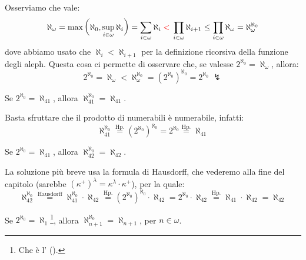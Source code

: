 \begin{example}
	Osserviamo che vale:
	\[ \aleph_\omega = \max\left(\aleph_0, \sup_{i \in \omega} \aleph_i\right) = \sum_{i \in \omega} \aleph_i \;\textcolor{red}{<}\; \prod_{i \in \omega} \aleph_{i + 1} \leq \prod_{i \in \omega} \aleph_\omega = \aleph_\omega^{\aleph_0}
		\]
	dove abbiamo usato che $\aleph_i < \aleph_{i + 1}$ per la definizione ricorsiva della funzione degli aleph. Questa cosa ci permette di osservare che, se valesse $2^{\aleph_0} = \aleph_\omega$, allora:
	\[ 2^{\aleph_0} = \aleph_\omega < \aleph_\omega^{\aleph_0} = (2^{\aleph_0})^{\aleph_0} = 2^{\aleph_0} \; \lightning
		\]
\end{example}

\begin{exercise}[Facile]
	Se $2^{\aleph_0} = \aleph_{41}$, allora $\aleph_{41}^{\aleph_0} = \aleph_{41}$.
\end{exercise}

\begin{soln}
	Basta sfruttare che il prodotto di numerabili è numerabile, infatti:
	\[ \aleph_{41}^{\aleph_0} \overset{\text{Hp.}}{=} (2^{\aleph_0})^{\aleph_0} = 2^{\aleph_0} \overset{\text{Hp.}}{=} \aleph_{41}
		\]
\end{soln}

\begin{exercise}[Difficile]
	Se $2^{\aleph_0} = \aleph_{41}$, allora $\aleph_{42}^{\aleph_0} = \aleph_{42}$.
\end{exercise}

\begin{soln}
	La soluzione più breve usa la formula di Hausdorff, che vederemo alla fine del capitolo (sarebbe $(\kappa^+)^{\lambda} = \kappa^{\lambda} \cdot \kappa^+$), per la quale:
	\[ \aleph_{42}^{\aleph_0} \overset{\text{Hausdorff}}{=} \aleph_{41}^{\aleph_0} \cdot \aleph_{42} \overset{\text{Hp.}}{=} (2^{\aleph_0})^{\aleph_0} \cdot \aleph_{42} = 2^{\aleph_0} \cdot \aleph_{42} \overset{\text{Hp.}}{=} \aleph_{41} \cdot \aleph_{42} = \aleph_{42}
		\]
\end{soln}

\begin{exercise}
	Se $2^{\aleph_0} = \aleph_{1}$\footnote{Che è l' ().}, allora $\aleph_{n+1}^{\aleph_0} = \aleph_{n+1}$, per $n \in \omega$.
\end{exercise}


